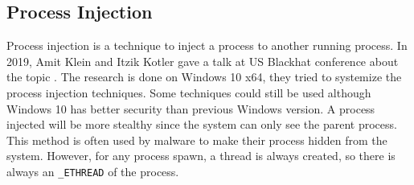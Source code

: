 \subsection[Process injection]{Process Injection}
\label{sec:processinjection}

Process injection is a technique to inject a process to another running process. In 2019, Amit Klein and Itzik Kotler gave a talk at US Blackhat conference about the topic \cite{processinjection}. The research is done on Windows 10 x64, they tried to systemize the process injection techniques. Some techniques could still be used although Windows 10 has better security than previous Windows version. A process injected will be more stealthy since the system can only see the parent process. This method is often used by malware to make their process hidden from the system. However, for any process spawn, a thread is always created, so there is always an \texttt{\_ETHREAD} of the process.
